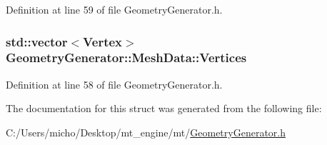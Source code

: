 Definition at line 59 of file Geometry\+Generator.\+h.

\subsubsection[{\texorpdfstring{Vertices}{Vertices}}]{\setlength{\rightskip}{0pt plus 5cm}std\+::vector$<${\bf Vertex}$>$ Geometry\+Generator\+::\+Mesh\+Data\+::\+Vertices}\hypertarget{struct_geometry_generator_1_1_mesh_data_a2a85f97f9a84b4f68d71cdcd41a7198b_a2a85f97f9a84b4f68d71cdcd41a7198b}{}\label{struct_geometry_generator_1_1_mesh_data_a2a85f97f9a84b4f68d71cdcd41a7198b_a2a85f97f9a84b4f68d71cdcd41a7198b}


Definition at line 58 of file Geometry\+Generator.\+h.



The documentation for this struct was generated from the following file\+:\begin{DoxyCompactItemize}
\item 
C\+:/\+Users/micho/\+Desktop/mt\+\_\+engine/mt/\hyperlink{_geometry_generator_8h}{Geometry\+Generator.\+h}\end{DoxyCompactItemize}
